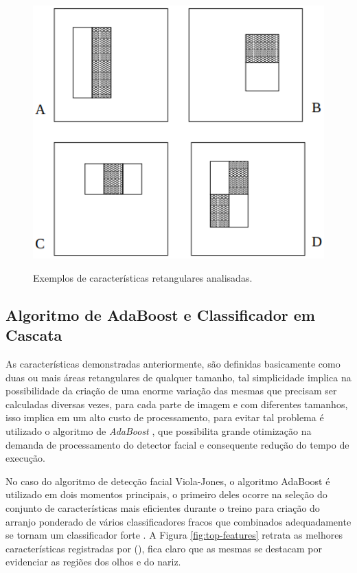 \begin{figure}[htb]
    \centering
    \caption{Exemplos de características retangulares analisadas.}
    \includegraphics[scale=.5]{figs/features.png}
    \label{fig:features}
\end{figure}

\subsection{Algoritmo de AdaBoost e Classificador em Cascata}

As características demonstradas anteriormente, são definidas basicamente como duas ou mais áreas retangulares de qualquer tamanho, tal simplicidade implica na possibilidade da criação de uma enorme variação das mesmas que precisam ser calculadas diversas vezes, para cada parte de imagem e com diferentes tamanhos, isso implica em um alto custo de processamento, para evitar tal problema é utilizado o algoritmo de \textit{AdaBoost} \cite{adaboost-Freund}, que possibilita grande otimização na demanda de processamento do detector facial e consequente redução do tempo de execução.

No caso do algoritmo de detecção facial Viola-Jones, o algoritmo AdaBoost é utilizado em dois momentos principais, o primeiro deles ocorre na seleção do conjunto de características mais eficientes durante o treino para criação do arranjo ponderado de vários classificadores fracos que combinados adequadamente se tornam um classificador forte \cite{fabio-luciana-2015}. A Figura \ref{fig:top-features} retrata as melhores características registradas por  (\citeyear{paper-viola-jones}), fica claro que as mesmas se destacam por evidenciar as regiões dos olhos e do nariz.

